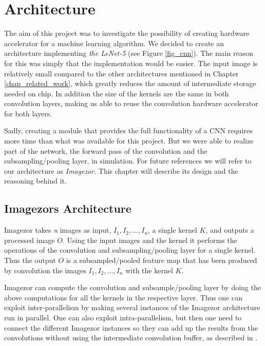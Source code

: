 \chapter{Architecture} \label{architecture}

The aim of this project was to investigate the possibility of creating hardware accelerator for a machine learning algorithm. We decided to create an architecture implementing \textit{the LeNet-5} \cite{LeCun1998} (see Figure \ref{fig_cnn}). The main reason for this was simply that the implementation would be easier. The input image is relatively small compared to the other architectures mentioned in Chapter \ref{chap_related_work}, which greatly reduces the amount of intermediate storage needed on chip. In addition the size of the kernels are the same in both convolution layers, making us able to reuse the convolution hardware accelerator for both layers. 

Sadly, creating a module that provides the full functionality of a CNN requires more time than what was available for this project. But we were able to realize part of the network, the forward pass of the convolution and the subsampling/pooling layer, in simulation. For future references we will refer to our architecture as \textit{Imagezor}. This chapter will describe its design and the reasoning behind it. 


\section{Imagezors Architecture}

Imagezor takes \textit{n} images as input, $ I_1, I_2, \dots, I_n $, a single kernel $ K $, and outputs a processed image $ O $. Using the input images and the kernel it performs the operations of the convolution and subsampling/pooling layer for a single kernel. Thus the output $ O $ is a subsampled/pooled feature map that has been produced by convolution the images $ I_1, I_2, \dots, I_n $ with the kernel $ K $. 

Imagezor can compute the convolution and subsample/pooling layer by doing the above computations for all the kernels in the respective layer. Thus one can exploit inter-parallelism by making several instances of the Imagezor architecture run in parallel. One can also exploit intra-parallelism, but then one need to connect the different Imagezor instances so they can add up the results from the convolutions without using the intermediate convolution buffer, as described in \cite{Chakradhar2010}.

